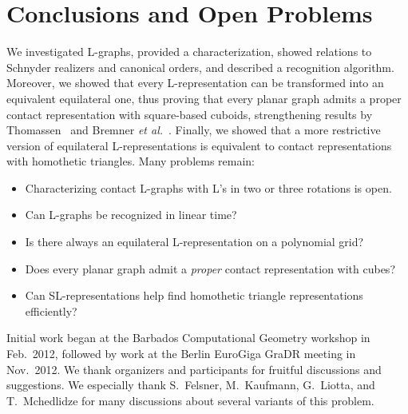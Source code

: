 \documentclass{llncs}
\begin{document}
\section{Conclusions and Open Problems}

We investigated L-graphs, provided a characterization, showed relations to Schnyder realizers and canonical orders, and described a recognition algorithm. Moreover, we showed that every L-representation can be transformed into an equivalent equilateral one, thus proving that every planar graph admits a proper contact representation with square-based cuboids, strengthening results by Thomassen~\cite{Thomassen86} and Bremner {\em et al.}~\cite{cubes12}. Finally, we showed that a more restrictive version of equilateral L-representations is equivalent to contact representations with homothetic triangles.
Many problems remain:
\begin{itemize}
 \item Characterizing contact L-graphs with L's in two or three rotations is open.
 \item Can L-graphs be recognized in linear time?
 \item Is there always an equilateral L-representation on a polynomial grid?
\item Does every planar graph admit a {\em proper} contact representation with cubes?
 \item Can SL-representations help find homothetic triangle representations efficiently?
\end{itemize}

\medskip
{} Initial work began at the Barbados Computational Geometry workshop in Feb.~2012, followed by work at the Berlin EuroGiga GraDR meeting in Nov.~2012. 
We thank organizers and participants for fruitful discussions and suggestions. We especially thank S.~Felsner, M.~Kaufmann, G.~Liotta, and T.~Mchedlidze for many discussions about several variants of this problem.


{

}
\end{document}
